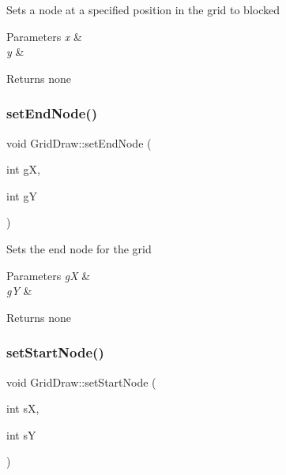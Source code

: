 Sets a node at a specified position in the grid to blocked


\begin{DoxyParams}{Parameters}
{\em x} & \\
\hline
{\em y} & \\
\hline
\end{DoxyParams}
\begin{DoxyReturn}{Returns}
none 
\end{DoxyReturn}
\mbox{\label{classGridDraw_ae484a45193bd941122c5393705e4246f}} 
\subsubsection{\texorpdfstring{set\+End\+Node()}{setEndNode()}}
{\footnotesize\ttfamily void Grid\+Draw\+::set\+End\+Node (\begin{DoxyParamCaption}\item[{int}]{gX,  }\item[{int}]{gY }\end{DoxyParamCaption})\hspace{0.3cm}{\ttfamily [inline]}}

Sets the end node for the grid


\begin{DoxyParams}{Parameters}
{\em gX} & \\
\hline
{\em gY} & \\
\hline
\end{DoxyParams}
\begin{DoxyReturn}{Returns}
none 
\end{DoxyReturn}
\mbox{\label{classGridDraw_aeaef2de4037646f14f31dcbe4e770493}} 
\subsubsection{\texorpdfstring{set\+Start\+Node()}{setStartNode()}}
{\footnotesize\ttfamily void Grid\+Draw\+::set\+Start\+Node (\begin{DoxyParamCaption}\item[{int}]{sX,  }\item[{int}]{sY }\end{DoxyParamCaption})\hspace{0.3cm}{\ttfamily [inline]}}

